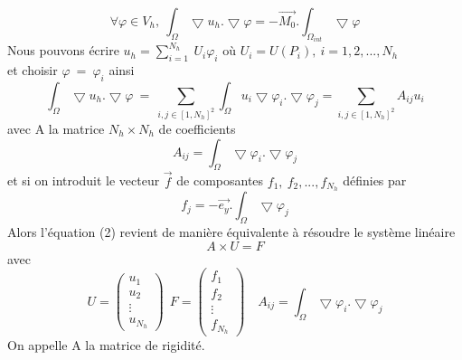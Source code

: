 \documentclass[a4paper,12pt,titlepage]{report}
\begin{document}
\begin{onehalfspace}
\[
	\forall \varphi \in V_{h} , \ \int_{\Omega}\bigtriangledown u_{h}. \bigtriangledown \varphi = -\vec{M_{0}}. \int_{\Omega_{int}}\bigtriangledown \varphi
\]
Nous pouvons écrire $u_{h} = \sum_{i=1}^{N_{h}}{\ U_{i}\varphi_{i}} \text{ \ \ où } U_{i} = U(P_{i}),\  i= 1,2,...,N_{h}$ \\ et choisir $\varphi\ =\ \varphi_{i}$
ainsi
\[
	\int_{\Omega}\bigtriangledown u_{h}.\bigtriangledown \varphi\ 
	=\ 
	\sum_{i, j \in [1, N_{h}]^{2}} \int_{\Omega}u_{i}\bigtriangledown\varphi_{i}. \bigtriangledown\varphi_{j} 
	= 
	\sum_{i,j \in [1, N_{h}]^{2}} A_{ij} u_{i}
\]
avec A la matrice $N_{h} \times N_{h}$ de coefficients
\[
A_{ij}  = \int_{\Omega}\bigtriangledown\varphi_{i}.\bigtriangledown\varphi_{j}
\]
et si on introduit le vecteur $\vec{f}$ de composantes $f_{1},\ f_{2},..., f_{N_{h}}$ définies par
\[
f_{j} =  -\vec{e_{y}}.\int_{\Omega} \bigtriangledown\varphi_{j}
\]
Alors l'équation (2) revient de manière équivalente à résoudre le système linéaire 
\[
	A \times U =F
\]
 avec 
\[
U = 
\begin{pmatrix}
   u_{1} \\
   u_{2} \\
   \vdots \\
   u_{N_{h}}
\end{pmatrix}
\ \ F = 
\begin{pmatrix}
   f_{1} \\
   f_{2} \\
   \vdots \\
   f_{N_{h}}
\end{pmatrix}
\quad
A_{ij}  = \int_{\Omega}\bigtriangledown \varphi_{i}. \bigtriangledown \varphi_{j}
\]
On appelle A la matrice de rigidité.  \\

\newpage

\end{onehalfspace}
\end{document}
